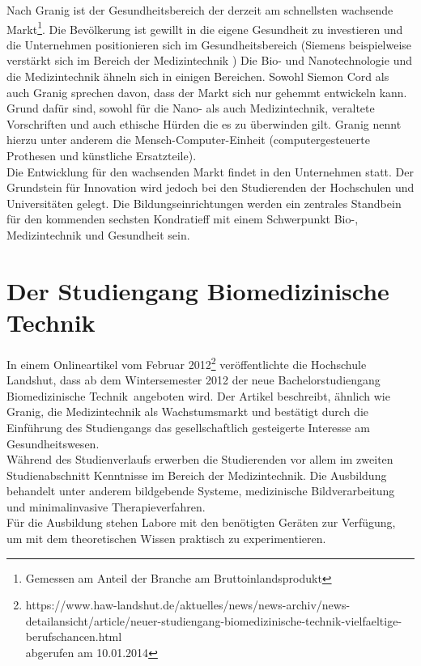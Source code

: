 Nach Granig\cite{nefiodow:gesundheit} ist der Gesundheitsbereich der derzeit am schnellsten wachsende Markt\footnote{Gemessen am Anteil der Branche am Bruttoinlandsprodukt}. Die Bevölkerung ist gewillt in die eigene Gesundheit zu investieren und die Unternehmen positionieren sich im Gesundheitsbereich (Siemens beispielweise verstärkt sich im Bereich der Medizintechnik \cite[S.111, 112]{nefiodow:gesundheit})
Die Bio- und Nanotechnologie und die Medizintechnik ähneln sich in einigen Bereichen. Sowohl Siemon Cord \cite{cord:innovation} als auch Granig \cite[Seite 116 f]{nefiodow:gesundheit} sprechen davon, dass der Markt sich nur gehemmt entwickeln kann. Grund dafür sind, sowohl für die Nano- als auch Medizintechnik, veraltete Vorschriften und auch ethische Hürden die es zu überwinden gilt. Granig nennt hierzu unter anderem die Mensch-Computer-Einheit \cite[S.117]{nefiodow:gesundheit}(computergesteuerte Prothesen und künstliche Ersatzteile).\\
Die Entwicklung für den wachsenden Markt findet in den Unternehmen statt. Der Grundstein für Innovation wird jedoch bei den Studierenden der Hochschulen und Universitäten gelegt. Die Bildungseinrichtungen werden ein zentrales Standbein für den kommenden sechsten Kondratieff mit einem Schwerpunkt Bio-, Medizintechnik und Gesundheit sein.


\section{Der Studiengang Biomedizinische Technik}\label{einleitung:biomedTechnik}
In einem Onlineartikel vom Februar 2012\footnote{https://www.haw-landshut.de/aktuelles/news/news-archiv/news-detailansicht/article/neuer-studiengang-biomedizinische-technik-vielfaeltige-berufschancen.html \\ abgerufen am 10.01.2014} veröffentlichte die Hochschule Landshut, dass ab dem Wintersemester 2012 der neue Bachelorstudiengang \glqq Biomedizinische Technik\grqq\ angeboten wird. Der Artikel beschreibt, ähnlich wie Granig, die Medizintechnik als Wachstumsmarkt und bestätigt durch die Einführung des Studiengangs das gesellschaftlich gesteigerte Interesse am Gesundheitswesen.\\
Während des Studienverlaufs \cite{hsla:modulBMT} erwerben die Studierenden vor allem im zweiten Studienabschnitt Kenntnisse im Bereich der Medizintechnik. Die Ausbildung behandelt unter anderem bildgebende Systeme, medizinische Bildverarbeitung und minimalinvasive Therapieverfahren.\\
Für die Ausbildung stehen Labore mit den benötigten Geräten zur Verfügung, um mit dem theoretischen Wissen praktisch zu experimentieren.

